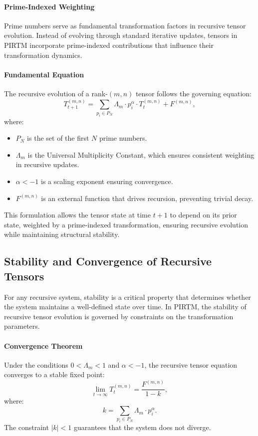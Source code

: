 \documentclass{article}
\theoremstyle{plain}
\begin{document}
\paragraph{Prime-Indexed Weighting}
Prime numbers serve as fundamental transformation factors in recursive tensor evolution. Instead of evolving through standard iterative updates, tensors in PIRTM incorporate prime-indexed contributions that influence their transformation dynamics.

\paragraph{Fundamental Equation}
The recursive evolution of a rank-\((m,n)\) tensor follows the governing equation:
\begin{equation}
    T_{t+1}^{(m,n)} = \sum_{p_i \in P_N} \Lambda_m \cdot p_i^\alpha \cdot T_t^{(m,n)} + F^{(m,n)},
\end{equation}
where:
\begin{itemize}
    \item \( P_N \) is the set of the first \( N \) prime numbers.
    \item \( \Lambda_m \) is the Universal Multiplicity Constant, which ensures consistent weighting in recursive updates.
    \item \( \alpha < -1 \) is a scaling exponent ensuring convergence.
    \item \( F^{(m,n)} \) is an external function that drives recursion, preventing trivial decay.
\end{itemize}

This formulation allows the tensor state at time \( t+1 \) to depend on its prior state, weighted by a prime-indexed transformation, ensuring recursive evolution while maintaining structural stability.

\subsection{Stability and Convergence of Recursive Tensors}

For any recursive system, stability is a critical property that determines whether the system maintains a well-defined state over time. In PIRTM, the stability of recursive tensor evolution is governed by constraints on the transformation parameters.

\paragraph{Convergence Theorem}
Under the conditions \( 0 < \Lambda_m < 1 \) and \( \alpha < -1 \), the recursive tensor equation converges to a stable fixed point:
\begin{equation}
    \lim_{t \to \infty} T_t^{(m,n)} = \frac{F^{(m,n)}}{1 - k},
\end{equation}
where:
\begin{equation}
    k = \sum_{p_i \in P_N} \Lambda_m \cdot p_i^\alpha.
\end{equation}
The constraint \( |k| < 1 \) guarantees that the system does not diverge.
\end{document}
